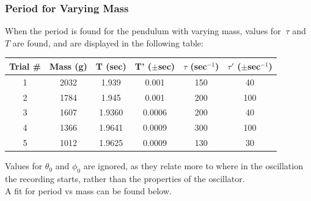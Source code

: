 \documentclass[12pt]{article}
\begin{document}
\subsubsection{Period for Varying Mass}
\label{section:q4bsummary}
When the period is found for the pendulum with varying mass, values for $~\tau$ and $T$ are found, and are displayed in the following table:
\begin{center}
    \begin{tabular}{||c c c c c c||} 
        \hline
        Trial \# & Mass (g) & T (sec) & T' ($\pm$sec) & $\tau$ (sec$^{-1}$) & $\tau'$ ($\pm$sec$^{-1}$) \\ [0.5ex] 
        \hline\hline
        1 & 2032 & 1.939 & 0.001 & 150 & 40 \\ 
        \hline
        2 & 1784 & 1.945 & 0.001 & 200 & 100 \\
        \hline
        3 & 1607 & 1.9360 & 0.0006 & 200 & 40 \\
        \hline
        4 & 1366 & 1.9641 & 0.0009 & 300 & 100 \\
        \hline
        5 & 1012 & 1.9625 & 0.0009 & 130 & 30 \\ [1ex] 
        \hline
    \end{tabular}
\end{center}
\noindent
Values for $\theta_0$ and $\phi_0$ are ignored, as they relate more to where in the oscillation the recording starts, rather than the properties of the oscillator.\\
\noindent
A fit for period vs mass can be found below.
\end{document}
